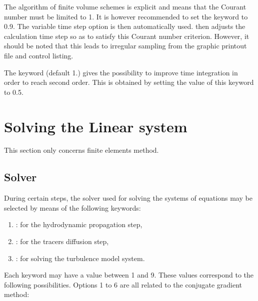  The algorithm of finite volume schemes is explicit and means that the Courant number must be limited to 1. It is however recommended to set the keyword  to 0.9. The variable time step option is then automatically used.  then adjusts the calculation time step so as to satisfy this Courant number criterion. However, it should be noted that this leads to irregular sampling from the graphic printout file and control listing.

 The keyword  (default 1.) gives the possibility to improve time integration in order to reach second order. This is obtained by setting the value of this keyword to 0.5.


\section{  Solving the Linear system}

This section only concerns finite elements method.
\subsection{ Solver}

 During certain steps, the solver used for solving the systems of equations may be selected by means of the following keywords:

\begin{enumerate}
\item  {}: for the hydrodynamic propagation step,

\item  {}: for the tracers diffusion step,

\item  {}: for solving the turbulence model system.
\end{enumerate}

 Each keyword may have a value between 1 and 9. These values correspond to the following possibilities. Options 1 to 6 are all related to the conjugate gradient method:

